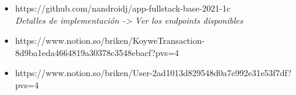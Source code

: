 \begin{itemize}

  
  \item https://github.com/nandroidj/app-fullstack-base-2021-1c
    \\ \textit{Detalles de implementación -> Ver los endpoints disponibles}

  \item https://www.notion.so/briken/KoyweTransaction-8d9ba1eda4664819a30378c3548ebacf?pvs=4

  \item https://www.notion.so/briken/User-2ad1013d829548d0a7e992e31e53f7df?pvs=4

\end{itemize}


